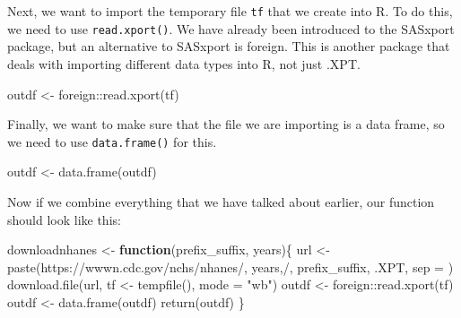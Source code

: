 \documentclass[
]{book}
\newenvironment{Shaded}{\begin{snugshade}}{\end{snugshade}}
\newcommand{\AttributeTok}[1]{\textcolor[rgb]{0.77,0.63,0.00}{#1}}
\newcommand{\ControlFlowTok}[1]{\textcolor[rgb]{0.13,0.29,0.53}{\textbf{#1}}}
\newcommand{\FunctionTok}[1]{\textcolor[rgb]{0.00,0.00,0.00}{#1}}
\newcommand{\NormalTok}[1]{#1}
\newcommand{\OtherTok}[1]{\textcolor[rgb]{0.56,0.35,0.01}{#1}}
\newcommand{\SpecialCharTok}[1]{\textcolor[rgb]{0.00,0.00,0.00}{#1}}
\newcommand{\StringTok}[1]{\textcolor[rgb]{0.31,0.60,0.02}{#1}}
\begin{document}
Next, we want to import the temporary file \texttt{tf} that we create into R. To do this, we need to use \texttt{read.xport()}. We have already been introduced to the SASxport package, but an alternative to SASxport is foreign. This is another package that deals with importing different data types into R, not just .XPT.

\begin{Shaded}
\begin{Highlighting}[]
\NormalTok{outdf }\OtherTok{\textless{}{-}}\NormalTok{ foreign}\SpecialCharTok{::}\FunctionTok{read.xport}\NormalTok{(tf)}
\end{Highlighting}
\end{Shaded}

Finally, we want to make sure that the file we are importing is a data frame, so we need to use \texttt{data.frame()} for this.

\begin{Shaded}
\begin{Highlighting}[]
\NormalTok{outdf }\OtherTok{\textless{}{-}} \FunctionTok{data.frame}\NormalTok{(outdf)}
\end{Highlighting}
\end{Shaded}

Now if we combine everything that we have talked about earlier, our function should look like this:

\begin{Shaded}
\begin{Highlighting}[]
\NormalTok{downloadnhanes }\OtherTok{\textless{}{-}} \ControlFlowTok{function}\NormalTok{(prefix\_suffix, years)\{}
\NormalTok{    url }\OtherTok{\textless{}{-}} \FunctionTok{paste}\NormalTok{(}\StringTok{\textquotesingle{}https://wwwn.cdc.gov/nchs/nhanes/\textquotesingle{}}\NormalTok{, years,}\StringTok{\textquotesingle{}/\textquotesingle{}}\NormalTok{, prefix\_suffix, }\StringTok{\textquotesingle{}.XPT\textquotesingle{}}\NormalTok{, }\AttributeTok{sep =} \StringTok{\textquotesingle{}\textquotesingle{}}\NormalTok{)}
    \FunctionTok{download.file}\NormalTok{(url, tf }\OtherTok{\textless{}{-}} \FunctionTok{tempfile}\NormalTok{(), }\AttributeTok{mode =} \StringTok{"wb"}\NormalTok{)}
\NormalTok{    outdf }\OtherTok{\textless{}{-}}\NormalTok{ foreign}\SpecialCharTok{::}\FunctionTok{read.xport}\NormalTok{(tf)}
\NormalTok{    outdf }\OtherTok{\textless{}{-}} \FunctionTok{data.frame}\NormalTok{(outdf)}
  \FunctionTok{return}\NormalTok{(outdf)}
\NormalTok{\}}
\end{Highlighting}
\end{Shaded}
\end{document}
